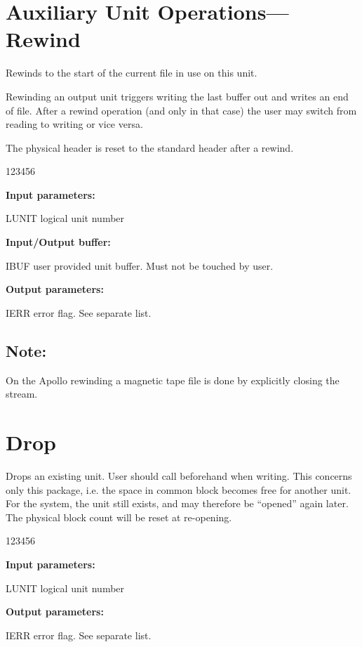\section{Auxiliary Unit Operations---Rewind}

 
Rewinds to the start of the current file in use on this unit.
 
Rewinding an output unit triggers writing the last buffer out and
writes an end of file. After a rewind operation (and only in that case)
the user may switch from reading to writing or vice versa.
 
The physical header is reset to the standard header after a rewind.

\begin{DLtt}{123456}
\item[{\rm\bf Input parameters:}]
\item[LUNIT] logical unit number
\item[{\rm\bf Input/Output buffer:}]
\item[IBUF] user provided unit buffer. Must not be touched by user.\\
\item[{\rm\bf Output parameters:}]
\item[IERR] error flag. See separate list.
\end{DLtt}

\subsection*{Note:}

On the Apollo rewinding a magnetic tape file is done by
explicitly closing the stream.

\section{Drop}

 
Drops an existing unit. User should call  beforehand when writing.
This concerns only this package, i.e. the space in common block
 becomes free for another unit. For the system, the unit
still exists, and may therefore be ``opened'' again later.
The physical block count will be reset at re-opening.

\begin{DLtt}{123456}
\item[{\rm\bf Input parameters:}]
\item[LUNIT] logical unit number
\item[{\rm\bf Output parameters:}]
\item[IERR] error flag. See separate list.
\end{DLtt}


